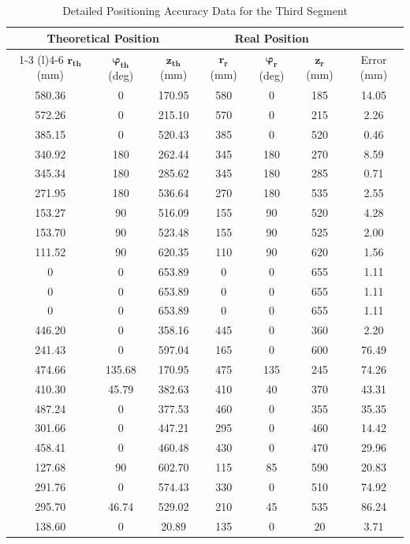 \documentclass[conference]{IEEEtran}
\begin{document}
\begin{table}[t] %

\captionsetup{skip=10pt}
\centering

\caption{Detailed Positioning Accuracy Data for the Third Segment}
\label{tab:segment3_error_data} %

\begin{tabular}{@{}ccccccc@{}}
\toprule
\multicolumn{3}{c}{Theoretical Position} & \multicolumn{3}{c}{Real Position} & \\
\cmidrule(r){1-3} \cmidrule(l){4-6}
$\boldsymbol{r_{th}}$ (mm) & $\boldsymbol{\varphi_{th}}$ (deg) & $\boldsymbol{z_{th}}$ (mm) & $\boldsymbol{r_{r}}$ (mm) & $\boldsymbol{\varphi_{r}}$ (deg) & $\boldsymbol{z_{r}}$ (mm) & Error (mm) \\
\midrule
580.36 & 0      & 170.95 & 580 & 0   & 185 & 14.05 \\
572.26 & 0      & 215.10 & 570 & 0   & 215 & 2.26 \\
385.15 & 0      & 520.43 & 385 & 0   & 520 & 0.46 \\
340.92 & 180    & 262.44 & 345 & 180 & 270 & 8.59 \\
345.34 & 180    & 285.62 & 345 & 180 & 285 & 0.71 \\
271.95 & 180    & 536.64 & 270 & 180 & 535 & 2.55 \\
153.27 & 90     & 516.09 & 155 & 90  & 520 & 4.28 \\
153.70 & 90     & 523.48 & 155 & 90  & 525 & 2.00 \\
111.52 & 90     & 620.35 & 110 & 90  & 620 & 1.56 \\
0      & 0      & 653.89 & 0   & 0   & 655 & 1.11 \\
0      & 0      & 653.89 & 0   & 0   & 655 & 1.11 \\
0      & 0      & 653.89 & 0   & 0   & 655 & 1.11 \\
446.20 & 0      & 358.16 & 445 & 0   & 360 & 2.20 \\
241.43 & 0      & 597.04 & 165 & 0   & 600 & 76.49 \\
474.66 & 135.68 & 170.95 & 475 & 135 & 245 & 74.26 \\
410.30 & 45.79  & 382.63 & 410 & 40  & 370 & 43.31 \\
487.24 & 0      & 377.53 & 460 & 0   & 355 & 35.35 \\
301.66 & 0      & 447.21 & 295 & 0   & 460 & 14.42 \\
458.41 & 0      & 460.48 & 430 & 0   & 470 & 29.96 \\
127.68 & 90     & 602.70 & 115 & 85  & 590 & 20.83 \\
291.76 & 0      & 574.43 & 330 & 0   & 510 & 74.92 \\
295.70 & 46.74  & 529.02 & 210 & 45  & 535 & 86.24 \\
138.60 & 0      & 20.89  & 135 & 0   & 20  & 3.71 \\
\bottomrule
\end{tabular}


\end{table}
\end{document}
